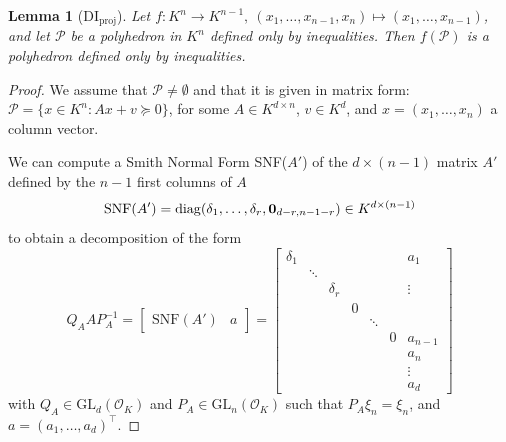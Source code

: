 \documentclass{elsarticle}
\theoremstyle{plain}
\newtheorem{lemma}[theorem]{Lemma}
\theoremstyle{definition}
\newcommand{\PP}{\mathcal{P}}
\newcommand{\OK}{\mathcal{O}_K}
\def\diag{\mathrm{diag}}
\newcommand{\GL}{\mathrm{GL}}
\begin{document}
\begin{lemma}[DI${}_{\mathrm{proj}}$]
  Let $f : K^n \to K^{n-1}, \: (x_1,\dots,x_{n-1},x_n) \mapsto (x_1,\dots,x_{n-1})$, and let
  $\PP$ be a polyhedron in $K^n$ defined only by inequalities. 
  Then $f(\PP)$ is a polyhedron defined only by inequalities. \label{lem:DIproj}
\end{lemma}
\begin{proof}
  We assume that $\PP \neq \emptyset$ and that it is given in
  matrix form: $\PP = \{x \in K^n : Ax+v \succeq 0\}$, for some 
  $A \in K^{d \times n}$, $v \in K^d$,
  and $x=(x_1,\dots,x_n)$ a column vector. 
  
  We can compute a Smith Normal Form SNF($A'$)
  of the $d \times (n-1)$ matrix $A'$ defined by the 
  $n-1$ first columns of $A$
  \[
\mathrm{SNF}(A') = \diag(\delta_1,\ldots,\delta_r,{\bf 0}_{d-r,n-1-r}) \in K^{d \times (n-1)}
\]
to obtain a decomposition of the form
\[
Q_A A P_A^{-1} =
\begin{bmatrix}
 \mathrm{SNF}(A') & a
\end{bmatrix}
=
\left[
\begin{smallmatrix}
\delta_1 &        &          &   &        &   & a_1     \\[-.25cm]
         & \ddots &          &   &        &   &         \\[-.35cm]
         &	  & \delta_r &   &        &   &  \vdots \\
         &	  &          & 0 &        &   &         \\[-.25cm]
         &	  &          &   & \ddots &   &         \\
         &	  &          &   &	  & 0 & a_{n-1} \\ 
         &	  &          &   &	  &   & a_n 	\\
         &	  &          &   &	  &   & \vdots 	\\
         &	  &          &   &	  &   & a_d 	
\end{smallmatrix}
\right]
\]
with $Q_A \in \GL_d(\OK)$ and $P_A \in \GL_n(\OK)$ such that $P_A \xi_n = \xi_n$,
and $a = (a_1,\ldots,a_d)^\intercal$.


\end{proof}
\end{document}

